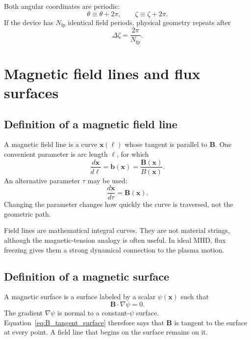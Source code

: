 Both angular coordinates are periodic:
\begin{equation}
\theta\equiv\theta+2\pi,
\qquad
\zeta\equiv\zeta+2\pi.
\end{equation}
If the device has $N_{\mathrm{fp}}$ identical field periods, physical geometry repeats after
\begin{equation}
\Delta\zeta=\frac{2\pi}{N_{\mathrm{fp}}}.
\end{equation}

\section{Magnetic field lines and flux surfaces}
\label{sec:flux_surfaces}

\subsection{Definition of a magnetic field line}
A magnetic field line is a curve $\mathbf x(\ell)$ whose tangent is parallel to $\mathbf B$. One convenient parameter is arc length $\ell$, for which
\begin{equation}
\frac{d\mathbf x}{d\ell}=\mathbf b(\mathbf x)=\frac{\mathbf B(\mathbf x)}{B(\mathbf x)}.
\label{eq:field_line_arclength}
\end{equation}
An alternative parameter $\tau$ may be used:
\begin{equation}
\frac{d\mathbf x}{d\tau}=\mathbf B(\mathbf x).
\label{eq:field_line_B}
\end{equation}
Changing the parameter changes how quickly the curve is traversed, not the geometric path.

Field lines are mathematical integral curves. They are not material strings, although the magnetic-tension analogy is often useful. In ideal MHD, flux freezing gives them a strong dynamical connection to the plasma motion.

\subsection{Definition of a magnetic surface}
A magnetic surface is a surface labeled by a scalar $\psi(\mathbf x)$ such that
\begin{equation}
\mathbf B\cdot\nabla\psi=0.
\label{eq:B_tangent_surface}
\end{equation}
The gradient $\nabla\psi$ is normal to a constant-$\psi$ surface. Equation~\eqref{eq:B_tangent_surface} therefore says that $\mathbf B$ is tangent to the surface at every point. A field line that begins on the surface remains on it.

